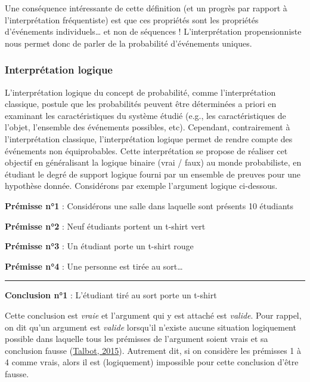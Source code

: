\documentclass[
  a4paper,11pt,twoside,onecolumn,openright,final,oldfontcommands]{memoir}
\theoremstyle{definition}
\theoremstyle{definition}
\theoremstyle{definition}
\theoremstyle{definition}
\theoremstyle{remark}
\begin{document}
Une conséquence intéressante de cette définition (et un progrès par rapport à l'interprétation fréquentiste) est que ces propriétés sont les propriétés d'événements individuels\ldots{} et non de séquences ! L'interprétation propensionniste nous permet donc de parler de la probabilité d'événements uniques.

\hypertarget{interpruxe9tation-logique}{%
\subsubsection{Interprétation logique}\label{interpruxe9tation-logique}}

L'interprétation logique du concept de probabilité, comme l'interprétation classique, postule que les probabilités peuvent être déterminées a priori en examinant les caractéristiques du système étudié (e.g., les caractéristiques de l'objet, l'ensemble des événements possibles, etc). Cependant, contrairement à l'interprétation classique, l'interprétation logique permet de rendre compte des événements non équiprobables. Cette interprétation se propose de réaliser cet objectif en généralisant la logique binaire (vrai / faux) au monde probabiliste, en étudiant le degré de support logique fourni par un ensemble de preuves pour une hypothèse donnée. Considérons par exemple l'argument logique ci-dessous.

\textbf{Prémisse n°1} : Considérons une salle dans laquelle sont présents 10 étudiants

\textbf{Prémisse n°2} : Neuf étudiants portent un t-shirt vert

\textbf{Prémisse n°3} : Un étudiant porte un t-shirt rouge

\textbf{Prémisse n°4} : Une personne est tirée au sort\ldots{}

\par

\noindent

\rule{\textwidth}{1pt}

\textbf{Conclusion n°1} : L'étudiant tiré au sort porte un t-shirt

Cette conclusion est \emph{vraie} et l'argument qui y est attaché est \emph{valide}. Pour rappel, on dit qu'un argument est \emph{valide} lorsqu'il n'existe aucune situation logiquement possible dans laquelle tous les prémisses de l'argument soient vrais et sa conclusion fausse (\protect\hyperlink{ref-talbot_critical_2015}{Talbot, 2015}). Autrement dit, si on considère les prémisses 1 à 4 comme vrais, alors il est (logiquement) impossible pour cette conclusion d'être fausse.
\end{document}
